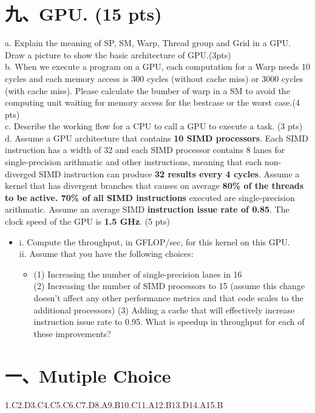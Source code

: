 \documentclass[UTF8]{ctexart}
\begin{document}
\section*{九、GPU. (15 pts)}
a. Explain the meaning of SP, SM, Warp, Thread group and Grid in a GPU. Draw a picture to show the basic architecture of GPU.(3pts)\\
b. When we execute a program on a GPU, each computation for a Warp needs 10 cycles and each memory access is 300 cycles (without cache miss) or 3000 
cycles (with cache miss). Please calculate the bumber of warp in a SM to avoid the computing unit waiting for memory access for the bestcase or the 
worst case.(4 pts)\\
c. Describe the working flow for a CPU to call a GPU to execute a task. (3 pts) \\
d. Assume a GPU architecture that contains {\bfseries 10 SIMD processors}. Each SIMD instruction has a width of 32 and each SIMD processor contains 8 
lanes for single-precision arithmatic and other instructions, meaning that each non-diverged SIMD instruction can produce {\bfseries 32 results every 
4 cycles}. Assume a kernel that has divergent branches that causes on average {\bfseries 80\% of the threads to be active. 70\% of all SIMD instructions} 
executed are single-precision arithmatic. Assume an average SIMD {\bfseries instruction issue rate of 0.85}. The clock speed of the GPU is {\bfseries 1.5 
GHz}. (5 pts)\\
\begin{itemize}
    \item[]
    i. Compute the throughput, in GFLOP/sec, for this kernel on this GPU.\\
    ii. Assume that you have the following choices:
    \begin{itemize}
        \item[]
        (1) Increasing the number of single-precision lanes in 16\\
        (2) Increasing the number of SIMD processors to 15 (assume this change doesn't affect any other performance metrics and that code scales 
to the additional processors)
        (3) Adding a cache that will effectively increase instruction issue rate to 0.95. What is speedup in throughput for each of these improvements?\\
    \end{itemize}
\end{itemize}
    


\newpage
\section*{一、Mutiple Choice }
1.C\quad 2.D\quad 3.C\quad 4.C\quad 5.C\quad 6.C\quad 7.D\quad 8.A\quad 9.B\quad 10.C\quad 11.A\quad 12.B\quad 13.D\quad 14.A\quad 15.B\quad
\end{document}
